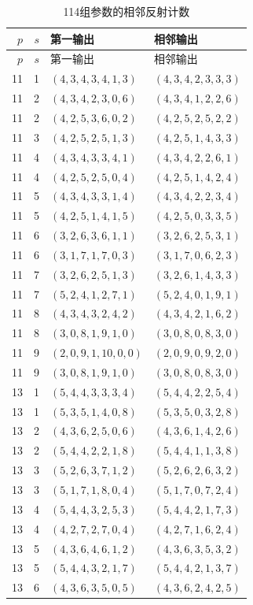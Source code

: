 \documentclass[11pt,a4paper]{article}
\theoremstyle{definition}
\numberwithin{equation}{section}
\begin{document}
\begingroup\small
\begin{longtable}{rrll}
\caption{114组参数的相邻反射计数}\label{tab:root-data}\\
\toprule $p$&$s$&第一输出&相邻输出\\\midrule\endfirsthead
\toprule $p$&$s$&第一输出&相邻输出\\\midrule\endhead
11&1&$(4,3,4,3,4,1,3)$&$(4,3,4,2,3,3,3)$\\
11&2&$(4,3,4,2,3,0,6)$&$(4,3,4,1,2,2,6)$\\
11&2&$(4,2,5,3,6,0,2)$&$(4,2,5,2,5,2,2)$\\
11&3&$(4,2,5,2,5,1,3)$&$(4,2,5,1,4,3,3)$\\
11&4&$(4,3,4,3,3,4,1)$&$(4,3,4,2,2,6,1)$\\
11&4&$(4,2,5,2,5,0,4)$&$(4,2,5,1,4,2,4)$\\
11&5&$(4,3,4,3,3,1,4)$&$(4,3,4,2,2,3,4)$\\
11&5&$(4,2,5,1,4,1,5)$&$(4,2,5,0,3,3,5)$\\
11&6&$(3,2,6,3,6,1,1)$&$(3,2,6,2,5,3,1)$\\
11&6&$(3,1,7,1,7,0,3)$&$(3,1,7,0,6,2,3)$\\
11&7&$(3,2,6,2,5,1,3)$&$(3,2,6,1,4,3,3)$\\
11&7&$(5,2,4,1,2,7,1)$&$(5,2,4,0,1,9,1)$\\
11&8&$(4,3,4,3,2,4,2)$&$(4,3,4,2,1,6,2)$\\
11&8&$(3,0,8,1,9,1,0)$&$(3,0,8,0,8,3,0)$\\
11&9&$(2,0,9,1,10,0,0)$&$(2,0,9,0,9,2,0)$\\
11&9&$(3,0,8,1,9,1,0)$&$(3,0,8,0,8,3,0)$\\
13&1&$(5,4,4,3,3,3,4)$&$(5,4,4,2,2,5,4)$\\
13&1&$(5,3,5,1,4,0,8)$&$(5,3,5,0,3,2,8)$\\
13&2&$(4,3,6,2,5,0,6)$&$(4,3,6,1,4,2,6)$\\
13&2&$(5,4,4,2,2,1,8)$&$(5,4,4,1,1,3,8)$\\
13&3&$(5,2,6,3,7,1,2)$&$(5,2,6,2,6,3,2)$\\
13&3&$(5,1,7,1,8,0,4)$&$(5,1,7,0,7,2,4)$\\
13&4&$(5,4,4,3,2,5,3)$&$(5,4,4,2,1,7,3)$\\
13&4&$(4,2,7,2,7,0,4)$&$(4,2,7,1,6,2,4)$\\
13&5&$(4,3,6,4,6,1,2)$&$(4,3,6,3,5,3,2)$\\
13&5&$(5,4,4,3,2,1,7)$&$(5,4,4,2,1,3,7)$\\
13&6&$(4,3,6,3,5,0,5)$&$(4,3,6,2,4,2,5)$\\

\end{longtable}
\end{document}
